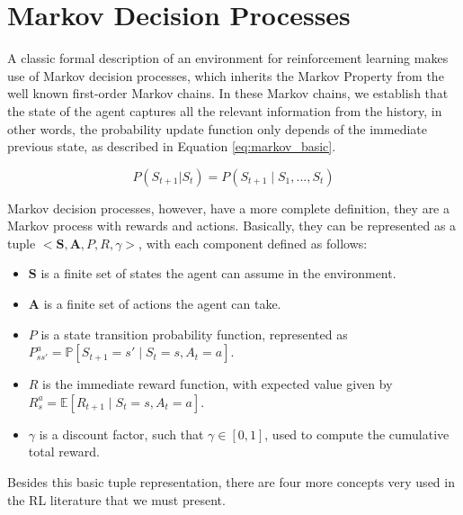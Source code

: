 \section{Markov Decision Processes}

A classic formal description of an environment for reinforcement learning makes use of Markov decision processes, which inherits the Markov Property from the well known first-order Markov chains. In these Markov chains, we establish that the state of the agent captures all the relevant information from the history, in other words, the probability update function only depends of the immediate previous state, as described in Equation \eqref{eq:markov_basic}.

\begin{equation}
P(S_{t+1} | S_t) = P(S_{t+1} \mid S_1, ..., S_t)
\label{eq:markov_basic}
\end{equation}

Markov decision processes, however, have a more complete definition, they are a Markov process with rewards and actions. Basically, they can be represented as a tuple $<\textbf{S}, \textbf{A}, P, R, \gamma>$, with each component defined as follows:
\begin{itemize}
\item
	$\textbf{S}$ is a finite set of states the agent can assume in the environment.
\item
	$\textbf{A}$ is a finite set of actions the agent can take.
\item
	$P$ is a state transition probability function, represented as $P_{ss'}^a = \mathbb{P}[S_{t+1}=s' \mid S_t = s, A_t = a]$.
\item
	$R$ is the immediate reward function, with expected value given by $R_s^a = \mathbb{E}[R_{t+1} \mid S_t = s, A_t = a]$.
\item
	$\gamma$ is a discount factor, such that $\gamma \in [0,1]$, used to compute the cumulative total reward.
	
\end{itemize}

Besides this basic tuple representation, there are four more concepts very used in the RL literature that we must present.

